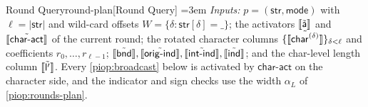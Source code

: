 \begin{DefinePIOP}{Round Query}{round-plan}[Round Query]
  \emergencystretch=3em\relax
  \emph{Inputs:} $p=(\mathsf{str},\mathsf{mode})$ with $\ell=|\mathsf{str}|$ and wild-card offsets $W=\{\delta:\mathsf{str}[\delta]=\text{\_}\}$; the activators $\llbracket\tilde{\mathsf{a}}\rrbracket$ and $\llbracket\tilde{\mathsf{char\text{-}act}}\rrbracket$ of the current round; the rotated character columns $\{\llbracket\tilde{\mathsf{char}^{(\delta)}}\rrbracket\}_{\delta<\ell}$ and coefficients $r_0,\dots,r_{\ell-1}$; $\llbracket\tilde{\mathsf{bnd}}\rrbracket, \llbracket\tilde{\mathsf{orig\text{-}ind}}\rrbracket, \llbracket\tilde{\mathsf{int\text{-}ind}}\rrbracket, \llbracket\tilde{\mathsf{ind}}\rrbracket$; and the char-level length column $\llbracket\tilde{\mathsf{l}'}\rrbracket$. Every \cref{piop:broadcast} below is activated by $\mathsf{char\text{-}act}$ on the character side, and the indicator and sign checks use the width $\alpha_L$ of \cref{piop:rounds-plan}.
  \vspace{1mm}


\end{DefinePIOP}

